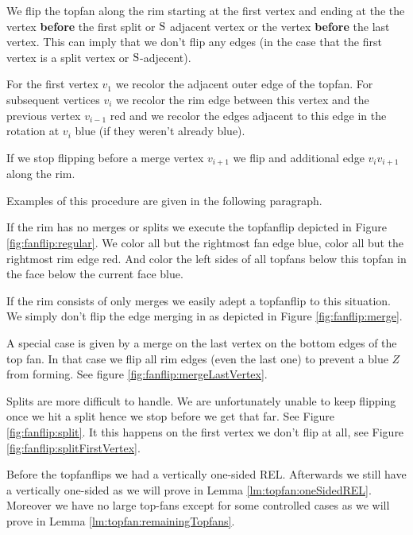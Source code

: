 We flip the topfan along the rim starting at the first vertex and ending at the the vertex \textbf{before} the first split or $\mathrm{S}$ adjacent vertex or the vertex \textbf{before} the last vertex. This can imply that we don't flip any edges (in the case that the first vertex is a split vertex or $\mathrm{S}$-adjecent).


For the first vertex $v_1$ we recolor the adjacent outer edge of the topfan. For subsequent vertices $v_i$ we recolor the rim edge between this vertex and the previous vertex $v_{i-1}$ red and we recolor the edges adjacent to this edge in the rotation at $v_i$ blue (if they weren't already blue).

If we stop flipping before a merge vertex $v_{i+1}$ we flip and additional edge $v_i v_{i+1}$ along the rim.

Examples of this procedure are given in the following paragraph.


If the rim has no merges or splits we execute the topfanflip depicted in Figure \ref{fig:fanflip:regular}. We color all but the rightmost fan edge blue, color all but the rightmost rim edge red. And color the left sides of all topfans below this topfan in the face below the current face blue.

If the rim consists of only merges we easily adept a topfanflip to this situation. We simply don't flip the edge merging in as depicted in Figure \ref{fig:fanflip:merge}.

A special case is given by a merge on the last vertex on the bottom edges of the top fan. In that case we flip all rim edges (even the last one) to prevent a blue $Z$ from forming. See figure \ref{fig:fanflip:mergeLastVertex}.

Splits are more difficult to handle. We are unfortunately unable to keep flipping once we hit a split hence we stop before we get that far. See Figure \ref{fig:fanflip:split}. It this happens on the first vertex we don't flip at all, see Figure \ref{fig:fanflip:splitFirstVertex}.

Before the topfanflips we had a vertically one-sided REL. Afterwards we still have a vertically one-sided \rel as we will prove in Lemma \ref{lm:topfan:oneSidedREL}. Moreover we have no large top-fans except for some controlled cases as we will prove in Lemma \ref{lm:topfan:remainingTopfans}.

